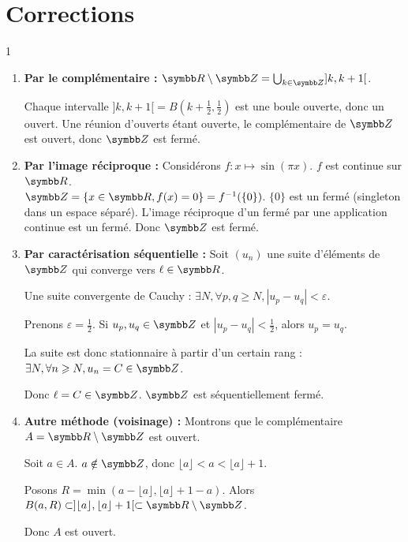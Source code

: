 \section{Corrections}
\begin{correction}{1}
\begin{enumerate}
    \item \textbf{Par le complémentaire :}
        $\R \setminus \Z = \bigcup_{k \in \Z} ]k, k+1[$.

        Chaque intervalle $]k, k+1[ = B(k+\frac{1}{2}, \frac{1}{2})$ est une boule ouverte, donc un ouvert.
        Une réunion d'ouverts étant ouverte, le complémentaire de $\Z$ est ouvert, donc $\Z$ est fermé.

    \item \textbf{Par l'image réciproque :}
        Considérons $f : x \mapsto \sin(\pi x)$.
        $f$ est continue sur $\R$. \\
        $\Z = \{ x \in \R, f(x)=0 \} = f^{-1}(\{0\})$.
        $\{0\}$ est un fermé (singleton dans un espace séparé). 
        L'image réciproque d'un fermé par une application continue est un fermé. 
        Donc $\Z$ est fermé.

    \item \textbf{Par caractérisation séquentielle :}
        Soit $(u_{n})$ une suite d'éléments de $\Z$ qui converge vers $\ell \in \R$.

        Une suite convergente de Cauchy : $\exists N, \forall p,q \geqslant N, |u_{p} - u_{q}| < \varepsilon$.

        Prenons $\varepsilon = \frac{1}{2}$.
        Si $u_{p}, u_{q} \in \Z$ et $|u_{p} - u_{q}| < \frac{1}{2}$, alors $u_{p} = u_{q}$.

        La suite est donc stationnaire à partir d'un certain rang : $\exists N, \forall n \geqslant N, u_{n} = C \in \Z$.

        Donc $\ell = C \in \Z$. $\Z$ est séquentiellement fermé.

    \item \textbf{Autre méthode (voisinage) :}
        Montrons que le complémentaire $A = \R \setminus \Z$ est ouvert.

        Soit $a \in A$. $a \notin \Z$, donc $\lfloor a \rfloor < a < \lfloor a \rfloor + 1$.

        Posons $R = \min(a - \lfloor a \rfloor, \lfloor a \rfloor + 1 - a)$.
        Alors $B(a, R) \subset ]\lfloor a \rfloor, \lfloor a \rfloor + 1[ \subset \R \setminus \Z$.

        Donc $A$ est ouvert.
\end{enumerate}
\end{correction}

